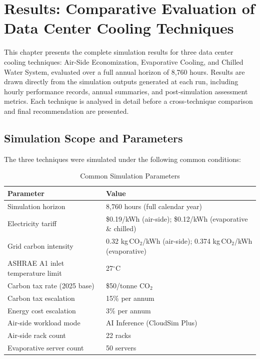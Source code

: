 ﻿\documentclass[12pt,a4paper]{report}
\newcommand{\degC}{$^{\circ}$C}
\begin{document}
\chapter{Results: Comparative Evaluation of Data Center Cooling Techniques}

\noindent This chapter presents the complete simulation results for three data center cooling
techniques: Air-Side Economization, Evaporative Cooling, and Chilled Water System,
evaluated over a full annual horizon of 8{,}760 hours. Results are drawn directly from
the simulation outputs generated at each run, including hourly performance records,
annual summaries, and post-simulation assessment metrics. Each technique is analysed in
detail before a cross-technique comparison and final recommendation are presented.

\section{Simulation Scope and Parameters}
\label{sec:scope}

The three techniques were simulated under the following common conditions:

\begin{table}[H]
\centering
\caption{Common Simulation Parameters}
\label{tab:sim_params}
\renewcommand{\arraystretch}{1.35}
\begin{tabular}{ll}
\toprule
\textbf{Parameter} & \textbf{Value} \\
\midrule
Simulation horizon & 8{,}760 hours (full calendar year) \\
Electricity tariff & \$0.19/kWh (air-side); \$0.12/kWh (evaporative \& chilled) \\
Grid carbon intensity & 0.32 kg\,CO$_2$/kWh (air-side); 0.374 kg\,CO$_2$/kWh (evaporative) \\
ASHRAE A1 inlet temperature limit & 27\degC \\
Carbon tax rate (2025 base) & \$50/tonne CO$_2$ \\
Carbon tax escalation & 15\% per annum \\
Energy cost escalation & 3\% per annum \\
Air-side workload mode & AI Inference (CloudSim Plus) \\
Air-side rack count & 22 racks \\
Evaporative server count & 50 servers \\
\bottomrule
\end{tabular}
\end{table}
\end{document}
